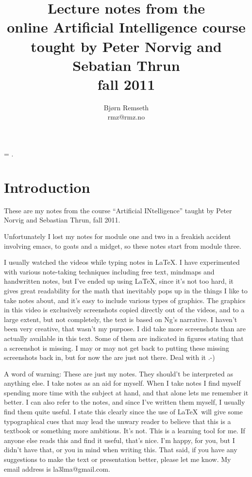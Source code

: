 \documentclass[a4, 12pt, english, USenglish]{scrreprt}
\begin{document}
\title{Lecture notes from the \\
online Artificial Intelligence course\\
tought by Peter Norvig and Sebatian Thrun \\
fall 2011}

\author{Bj\o{}rn Remseth \\ rmz@rmz.no}

\maketitle
\tableofcontents


\parskip=\bigskipamount
\parindent=0pt.

\begin{abstract}

\end{abstract}

\chapter*{Introduction}

These are my notes from the course ``Artificial INtelligence'' taught
by Peter Norvig and Sebastian Thrun, fall 2011.

Unfortunately I lost my notes for module one and two in a freakish
accident involving emacs, to goats and a midget, so these notes start
from module three.

I usually watched the videos while typing notes in \LaTeX.  I have
experimented with various note-taking techniques including free text,
mindmaps and handwritten notes, but I've ended up using \LaTeX, since
it's not too hard, it gives great readability for the math that
inevitably pops up in the things I like to take notes about, and it's
easy to include various types of graphics.  The graphics in this video
is exclusively screenshots copied directly out of the videos, and to a
large extent, but not  completely, the text is based on Ng's
narrative.   I haven't been very creative, that wasn't my purpose.  I
did take more screenshots than are actually available in this text.
Some of them are indicated in figures stating that a screenshot is
missing.  I may or may not get back to putting these missing
screenshots back in, but for  now the are just not there.  Deal with
it .-)

A word of warning: These are just my notes.  They should't be
interpreted as anything else.  I take notes as an aid for myself.
When I take notes I find myself spending more time with the subject at
hand, and that alone lets me remember it better.  I can also refer to
the notes, and since I've written them myself, I usually find them
quite useful.   I state this clearly since the use of \LaTeX\ will
give some typographical cues that may lead the unwary reader to
believe that this is a textbook or something more ambitious.  It's
not.  This is a learning tool for me.  If anyone else reads this and
find it useful, that's nice. I'm happy,  for you, but I didn't have
that, or you in mind when writing this.   That said, if you have any
suggestions to make the text or presentation better, please let me
know.  My email address is la3lma@gmail.com.
\end{document}
